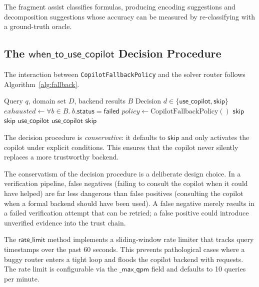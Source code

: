 \documentclass[11pt]{article}
\newcommand{\CopFallback}{\texttt{CopilotFallbackPolicy}}
\begin{document}
The fragment assist classifies formulas, producing encoding
suggestions and decomposition suggestions whose accuracy can be
measured by re-classifying with a ground-truth oracle.

\subsection{The \texorpdfstring{$\mathsf{when\_to\_use\_copilot}$}%
  {when\_to\_use\_copilot} Decision Procedure}
\label{sec:when-to-use}

The interaction between \CopFallback{} and the solver router
follows Algorithm~\ref{alg:fallback}.

\begin{algorithm}[ht]
\caption{Copilot fallback decision procedure.}
\label{alg:fallback}
\begin{algorithmic}[1]
\REQUIRE Query $q$, domain set $D$, backend results $B$
\ENSURE Decision $d \in \{\mathsf{use\_copilot},
  \mathsf{skip}\}$
\STATE $\mathit{exhausted} \leftarrow
  \forall b \in B.\; b.\mathsf{status} = \mathsf{failed}$
\STATE $\mathit{policy} \leftarrow
  \text{CopilotFallbackPolicy}()$
  \RETURN $\mathsf{skip}$
\ENDIF
{}
  \RETURN $\mathsf{skip}$
\ENDIF
{}
  \RETURN $\mathsf{use\_copilot}$
\ENDIF
{}
  \RETURN $\mathsf{use\_copilot}$
\ENDIF
\RETURN $\mathsf{skip}$
\end{algorithmic}
\end{algorithm}

The decision procedure is \emph{conservative}: it defaults to
$\mathsf{skip}$ and only activates the copilot under explicit
conditions.  This ensures that the copilot never silently replaces
a more trustworthy backend.

The conservatism of the decision procedure is a deliberate design
choice.  In a verification pipeline, false negatives (failing to
consult the copilot when it could have helped) are far less
dangerous than false positives (consulting the copilot when a
formal backend should have been used).  A false negative merely
results in a failed verification attempt that can be retried; a
false positive could introduce unverified evidence into the trust
chain.

The $\mathsf{rate\_limit}$ method implements a sliding-window rate
limiter that tracks query timestamps over the past 60 seconds.
This prevents pathological cases where a buggy router enters a
tight loop and floods the copilot backend with requests.  The
rate limit is configurable via the $\mathsf{\_max\_qpm}$ field
and defaults to 10 queries per minute.
\end{document}
